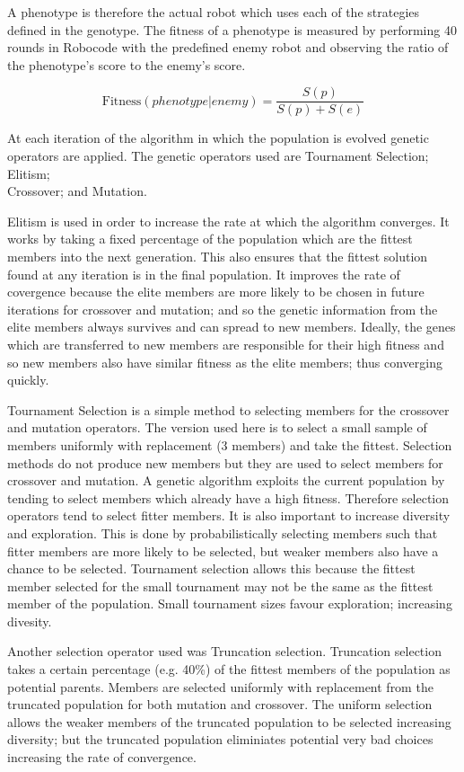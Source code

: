 A phenotype is therefore the actual robot which uses each of the strategies defined in the genotype. The fitness of a phenotype is measured by performing 40 rounds in Robocode with the predefined enemy robot and observing the ratio of the phenotype's score to the enemy's score.

\begin{equation}
\text{Fitness}\left({phenotype}|{enemy}\right) = 
\frac{S(p)}{S(p) + S(e)}
\end{equation}

At each iteration of the algorithm in which the population is evolved genetic operators are applied. The genetic operators used are Tournament Selection; Elitism; \\ Crossover;  and Mutation. 

Elitism is used in order to increase the rate at which the algorithm converges. It works by taking a fixed percentage of the population which are the fittest members into the next generation. This also ensures that the fittest solution found at any iteration is in the final population. It improves the rate of covergence because the elite members are more likely to be chosen in future iterations for crossover and mutation; and so the genetic information from the elite members always survives and can spread to new members. Ideally, the genes which are transferred to new members are responsible for their high fitness and so new members also have similar fitness as the elite members; thus converging quickly.

Tournament Selection is a simple method to selecting members for the crossover and mutation operators. The version used here is to select a small sample of members uniformly with replacement (3 members) and take the fittest. Selection methods do not produce new members but they are used to select members for crossover and mutation. A genetic algorithm exploits the current population by tending to select members which already have a high fitness. Therefore selection operators tend to select fitter members. It is also important to increase diversity and exploration. This is done by probabilistically selecting members such that fitter members are more likely to be selected, but weaker members also have a chance to be selected. Tournament selection allows this because the fittest member selected for the small tournament may not be the same as the fittest member of the population. Small tournament sizes favour exploration; increasing divesity.

Another selection operator used was Truncation selection. Truncation selection takes a certain percentage (e.g. 40\%) of the fittest members of the population as potential parents. Members are selected uniformly with replacement from the truncated population for both mutation and crossover. The uniform selection allows the weaker members of the truncated population to be selected increasing diversity; but the truncated population eliminiates potential very bad choices increasing the rate of convergence.

